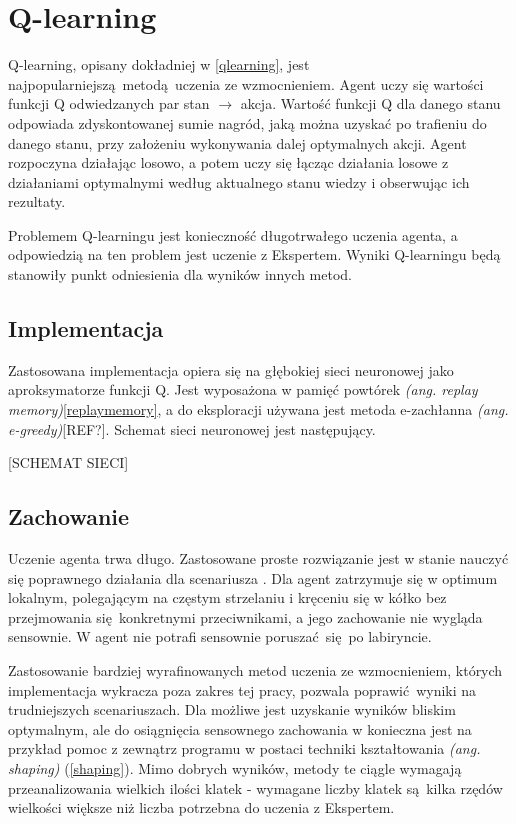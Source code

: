 \section{Q-learning}\label{q_learning}
Q-learning, opisany dokładniej w \ref{qlearning},  jest najpopularniejszą metodą uczenia ze wzmocnieniem. Agent uczy się wartości funkcji Q odwiedzanych par stan $\to$ akcja. Wartość funkcji Q dla danego stanu odpowiada zdyskontowanej sumie nagród, jaką można uzyskać po trafieniu do danego stanu, przy założeniu wykonywania dalej optymalnych akcji. Agent rozpoczyna działając losowo, a potem uczy się łącząc działania losowe z działaniami optymalnymi według aktualnego stanu wiedzy i obserwując ich rezultaty.

Problemem Q-learningu jest konieczność długotrwałego uczenia agenta, a odpowiedzią na ten problem jest uczenie z Ekspertem. Wyniki Q-learningu będą stanowiły punkt odniesienia dla wyników innych metod.

\subsection{Implementacja}

Zastosowana implementacja opiera się na głębokiej sieci neuronowej jako aproksymatorze funkcji Q. Jest wyposażona w pamięć powtórek \textit{(ang. replay memory)}\ref{replaymemory}, a do eksploracji używana jest metoda e-zachłanna \textit{(ang. e-greedy)}[REF?]. Schemat sieci neuronowej jest następujący.

[SCHEMAT SIECI]


\subsection{Zachowanie}
Uczenie agenta trwa długo. Zastosowane proste rozwiązanie jest w stanie nauczyć się poprawnego działania dla scenariusza . Dla  agent zatrzymuje się w optimum lokalnym, polegającym na częstym strzelaniu i kręceniu się w kółko bez przejmowania się konkretnymi przeciwnikami, a jego zachowanie nie wygląda sensownie. W  agent nie potrafi sensownie poruszać się po labiryncie.

Zastosowanie bardziej wyrafinowanych metod uczenia ze wzmocnieniem, których implementacja wykracza poza zakres tej pracy, pozwala poprawić wyniki na trudniejszych scenariuszach. Dla  możliwe jest uzyskanie wyników bliskim optymalnym, ale do osiągnięcia sensownego zachowania w  konieczna jest na przykład pomoc z zewnątrz programu w postaci techniki kształtowania \textit{(ang. shaping)} (\ref{shaping}). Mimo dobrych wyników, metody te ciągle wymagają przeanalizowania wielkich ilości klatek - wymagane liczby klatek są kilka rzędów wielkości większe niż liczba potrzebna do uczenia z Ekspertem.


